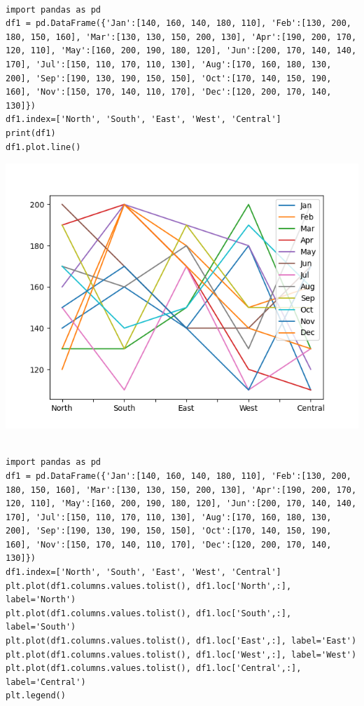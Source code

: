 \documentclass[11pt]{article}
\begin{document}
\newpage
\begin{verbatim}

import pandas as pd
df1 = pd.DataFrame({'Jan':[140, 160, 140, 180, 110], 'Feb':[130, 200, 180, 150, 160], 'Mar':[130, 130, 150, 200, 130], 'Apr':[190, 200, 170, 120, 110], 'May':[160, 200, 190, 180, 120], 'Jun':[200, 170, 140, 140, 170], 'Jul':[150, 110, 170, 110, 130], 'Aug':[170, 160, 180, 130, 200], 'Sep':[190, 130, 190, 150, 150], 'Oct':[170, 140, 150, 190, 160], 'Nov':[150, 170, 140, 110, 170], 'Dec':[120, 200, 170, 140, 130]})
df1.index=['North', 'South', 'East', 'West', 'Central']
print(df1)
df1.plot.line()

\end{verbatim}

\begin{center}
\includegraphics[width=.9\linewidth]{fig0.png}
\end{center}



\newpage
\begin{verbatim}

import pandas as pd
df1 = pd.DataFrame({'Jan':[140, 160, 140, 180, 110], 'Feb':[130, 200, 180, 150, 160], 'Mar':[130, 130, 150, 200, 130], 'Apr':[190, 200, 170, 120, 110], 'May':[160, 200, 190, 180, 120], 'Jun':[200, 170, 140, 140, 170], 'Jul':[150, 110, 170, 110, 130], 'Aug':[170, 160, 180, 130, 200], 'Sep':[190, 130, 190, 150, 150], 'Oct':[170, 140, 150, 190, 160], 'Nov':[150, 170, 140, 110, 170], 'Dec':[120, 200, 170, 140, 130]})
df1.index=['North', 'South', 'East', 'West', 'Central']
plt.plot(df1.columns.values.tolist(), df1.loc['North',:], label='North')
plt.plot(df1.columns.values.tolist(), df1.loc['South',:], label='South')
plt.plot(df1.columns.values.tolist(), df1.loc['East',:], label='East')
plt.plot(df1.columns.values.tolist(), df1.loc['West',:], label='West')
plt.plot(df1.columns.values.tolist(), df1.loc['Central',:], label='Central')
plt.legend()

\end{verbatim}
\end{document}
